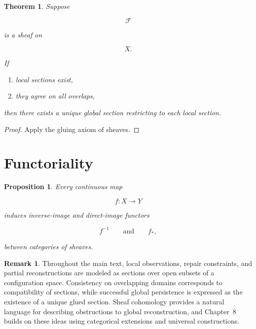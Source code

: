 \documentclass[11pt]{book}
\numberwithin{equation}{chapter}
\theoremstyle{definition}
\newtheorem{remark}[definition]{Remark}
\theoremstyle{plain}
\newtheorem{theorem}[definition]{Theorem}
\newtheorem{proposition}[definition]{Proposition}
\begin{document}
\begin{theorem}

Suppose

\[
\mathcal F
\]

is a sheaf on

\[
X.
\]

If

\begin{enumerate}

\item
local sections exist,

\item
they agree on all overlaps,

\end{enumerate}

then there exists a unique global section restricting to each local
section.

\end{theorem}


\begin{proof}

Apply the gluing axiom of sheaves.

\end{proof}


\section{Functoriality}

\begin{proposition}

Every continuous map

\[
f:X\rightarrow Y
\]

induces inverse-image and direct-image functors

\[
f^{-1}
\qquad\text{and}\qquad
f_*,
\]

between categories of sheaves.

\end{proposition}


\begin{remark}

Throughout the main text, local observations, repair constraints, and
partial reconstructions are modeled as sections over open subsets of a
configuration space. Consistency on overlapping domains corresponds to
compatibility of sections, while successful global persistence is
expressed as the existence of a unique glued section. Sheaf cohomology
provides a natural language for describing obstructions to global
reconstruction, and Chapter~8 builds on these ideas using categorical
extensions and universal constructions.

\end{remark}
\end{document}
